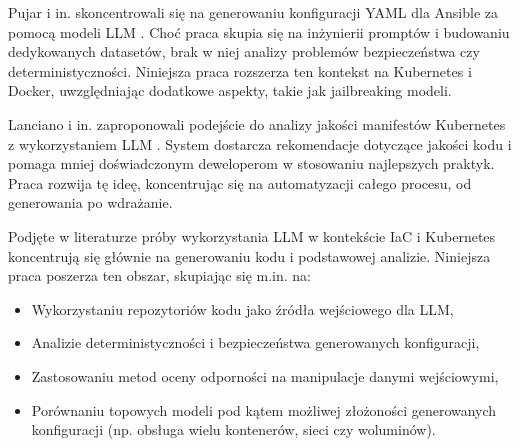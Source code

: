 Pujar i in. skoncentrowali się na generowaniu konfiguracji YAML dla Ansible za pomocą modeli LLM \cite{pujar_invited_2023}. Choć praca skupia się na inżynierii promptów i budowaniu dedykowanych datasetów, brak w niej analizy problemów bezpieczeństwa czy deterministyczności. Niniejsza praca rozszerza ten kontekst na Kubernetes i Docker, uwzględniając dodatkowe aspekty, takie jak jailbreaking modeli.

Lanciano i in. zaproponowali podejście do analizy jakości manifestów Kubernetes z wykorzystaniem LLM \cite{lanciano_analyzing_2023}. System dostarcza rekomendacje dotyczące jakości kodu i pomaga mniej doświadczonym deweloperom w stosowaniu najlepszych praktyk. Praca rozwija tę ideę, koncentrując się na automatyzacji całego procesu, od generowania po wdrażanie.

Podjęte w literaturze próby wykorzystania LLM w kontekście IaC i Kubernetes koncentrują się głównie na generowaniu kodu i podstawowej analizie. Niniejsza praca poszerza ten obszar, skupiając się m.in. na:

\begin{itemize}
    \item Wykorzystaniu repozytoriów kodu jako źródła wejściowego dla LLM,
    \item Analizie deterministyczności i bezpieczeństwa generowanych konfiguracji,
    \item Zastosowaniu metod oceny odporności na manipulacje danymi wejściowymi,
    \item Porównaniu topowych modeli pod kątem możliwej złożoności generowanych konfiguracji (np. obsługa wielu kontenerów, sieci czy woluminów).
\end{itemize}
